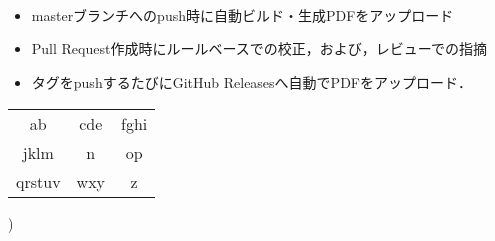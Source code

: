\documentclass{resume}
\title{
	\gt{title}\\
}
\author{
	\gt{○○大学 ○○学科 ○○専攻 学籍番号 名前}\\
}
\date{}
\begin{document}
\maketitle

\begin{itemize}
	\item masterブランチへのpush時に自動ビルド・生成PDFをアップロード
\item Pull Request作成時にルールベースでの校正，および，レビューでの指摘
	\item タグをpushするたびにGitHub Releasesへ自動でPDFをアップロード．
\end{itemize}

\begin{tabular}{ccc} \hline
	ab&cde&fghi\\
	jklm&n&op\\
	qrstuv&wxy&z\\
	\end{tabular}

\left\lvert
{}
\right)
　　　　　　　
       
\end{document}
